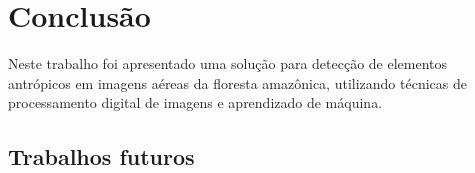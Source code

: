 \chapter{Conclusão}\label{cap:conclusao}

Neste trabalho foi apresentado uma solução para detecção de elementos antrópicos em imagens aéreas da floresta amazônica, utilizando técnicas de processamento digital de imagens e aprendizado de máquina.


\section{Trabalhos futuros}
